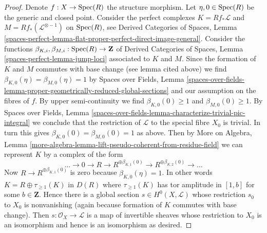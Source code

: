 \begin{proof}
\medskip\noindent
Denote $f : X \to \mathop{\mathrm{Spec}}(R)$ the structure morphism.
Let $\eta, 0 \in \mathop{\mathrm{Spec}}(R)$ be the generic and closed point.
Consider the perfect complexes
$K = Rf_*\mathcal{L}$ and $M = Rf_*(\mathcal{L}^{\otimes -1})$
on $\mathop{\mathrm{Spec}}(R)$, see Derived Categories of Spaces, Lemma
\ref{spaces-perfect-lemma-flat-proper-perfect-direct-image-general}.
Consider the functions
$\beta_{K, i}, \beta_{M, i} : \mathop{\mathrm{Spec}}(R) \to \mathbf{Z}$
of Derived Categories of Spaces, Lemma
\ref{spaces-perfect-lemma-jump-loci} associated to $K$ and $M$.
Since the formation of $K$ and $M$ commutes with
base change (see lemma cited above) we find
$\beta_{K, 0}(\eta) = \beta_{M, 0}(\eta) = 1$ by
Spaces over Fields, Lemma
\ref{spaces-over-fields-lemma-proper-geometrically-reduced-global-sections}
and our assumption on the fibres of $f$.
By upper semi-continuity we find
$\beta_{K, 0}(0) \geq 1$ and $\beta_{M, 0}(0) \geq 1$.
By 
Spaces over Fields, Lemma
\ref{spaces-over-fields-lemma-characterize-trivial-pic-integral}
we conclude that the restriction of $\mathcal{L}$
to the special fibre $X_0$ is trivial. In turn this gives
$\beta_{K, 0}(0) = \beta_{M, 0}(0) = 1$ as above.
Then by More on Algebra, Lemma
\ref{more-algebra-lemma-lift-pseudo-coherent-from-residue-field}
we can represent $K$ by a complex of the form
$$
\ldots \to 0 \to R \to R^{\oplus \beta_{K, 1}(0)} \to
R^{\oplus \beta_{K, 2}(0)} \to \ldots
$$
Now $R \to R^{\oplus \beta_{K, 1}(0)}$ is zero
because $\beta_{K, 0}(\eta) = 1$. In other words
$K = R \oplus \tau_{\geq 1}(K)$ in $D(R)$ where $\tau_{\geq 1}(K)$
has tor amplitude in $[1, b]$ for some $b \in \mathbf{Z}$.
Hence there is a global section $s \in H^0(X, \mathcal{L})$
whose restriction $s_0$
to $X_0$ is nonvanishing (again because formation of $K$
commutes with base change). Then $s : \mathcal{O}_X \to \mathcal{L}$
is a map of invertible sheaves whose restriction to $X_0$
is an isomorphism and hence is an isomorphism as desired.
\end{proof}

